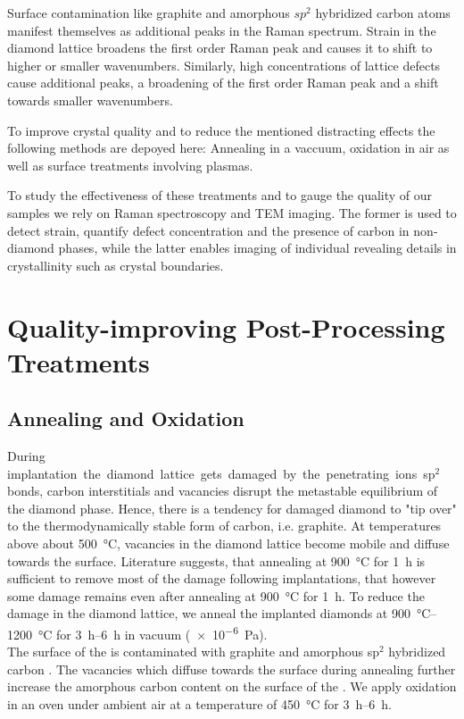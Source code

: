 		Surface contamination like graphite and amorphous $sp^2$ hybridized carbon atoms manifest themselves as additional peaks in the Raman spectrum.
		Strain in the diamond lattice broadens the first order Raman peak and causes it to shift to higher or smaller wavenumbers.
		Similarly, high concentrations of lattice defects cause additional peaks, a broadening of the first order Raman peak and a shift towards smaller wavenumbers.

		To improve crystal quality and to reduce the mentioned distracting effects the following methods are depoyed here: Annealing in a vaccuum, oxidation in air as well as surface treatments involving plasmas.

		To study the effectiveness of these treatments and to gauge the quality of our \nd samples we rely on Raman spectroscopy and TEM imaging. The former is used to detect strain, quantify defect concentration and the presence of carbon in non-diamond phases, while the latter enables imaging of individual \nds revealing details in crystallinity such as crystal boundaries.

		\section{Quality-improving Post-Processing Treatments}

			\subsection{Annealing and Oxidation}\label{subsection::ann_ox}

				During \si implantation the diamond lattice gets damaged by the penetrating ions.
				sp$^2$ bonds, carbon interstitials and vacancies disrupt the metastable equilibrium of the diamond phase. Hence, there is a tendency for damaged diamond to "tip over" to the thermodynamically stable form of carbon, i.e. graphite.
				At temperatures above about \SI{500}{\celsius}, vacancies in the diamond lattice become mobile and diffuse towards the surface\cite{Dresselhaus1992}.
				Literature suggests, that annealing at \SI{900}{\celsius} for \SI{1}{\hour} is sufficient to remove most of the damage following implantations, that however some damage remains even after annealing at \SI{900}{\celsius} for \SI{1}{\hour}.
				To reduce the damage in the diamond lattice, we anneal the implanted diamonds at \SIrange{900}{1200}{\celsius} for \SIrange{3}{6}{h} in vacuum (\SI{e-6}{Pa}).
				\\
				The surface of the \nds is contaminated with graphite and amorphous sp$^2$ hybridized carbon .
				The vacancies which diffuse towards the surface during annealing further increase the amorphous carbon content on the surface of the \nds \cite{}.
				We apply oxidation in an oven under ambient air at a temperature of \SI{450}{\celsius} for \SIrange{3}{6}{h}.

